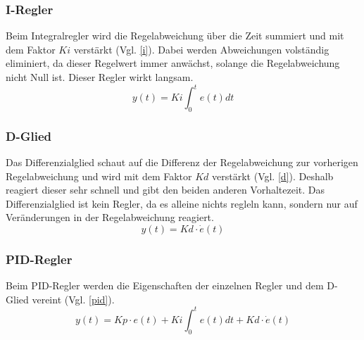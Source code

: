 \documentclass[12pt,a4paper, ngerman]{article}
\begin{document}
\subsubsection{I-Regler}
Beim Integralregler wird die Regelabweichung über die Zeit summiert und mit dem Faktor $Ki$ verstärkt (Vgl. \ref{i}). Dabei werden Abweichungen volständig eliminiert, da dieser Regelwert immer anwächst, solange die Regelabweichung nicht Null ist. Dieser Regler wirkt langsam\cite{website:rn-wissen_Regelungstechnik}.\\
\begin{equation}\label{i}
y(t)=Ki\int_{0}^{t}e(t)dt
\end{equation}

\subsubsection{D-Glied}
Das Differenzialglied schaut auf die Differenz der Regelabweichung zur vorherigen Regelabweichung und wird mit dem Faktor $Kd$ verstärkt (Vgl. \ref{d}). Deshalb reagiert dieser sehr schnell und gibt den beiden anderen Vorhaltezeit. Das Differenzialglied ist kein Regler, da es alleine nichts regleln kann, sondern nur auf Veränderungen in der Regelabweichung reagiert\cite{website:rn-wissen_Regelungstechnik}.\\
\begin{equation}\label{d}
y(t)=Kd\cdot \dot{e}(t)
\end{equation}

\subsubsection{PID-Regler}
Beim PID-Regler werden die Eigenschaften der einzelnen Regler und dem D-Glied vereint (Vgl. \ref{pid})\cite{website:rn-wissen_Regelungstechnik}.
\begin{equation}\label{pid}
y(t)=Kp\cdot e(t)+Ki\int_{0}^{t}e(t)dt+Kd\cdot \dot{e}(t)
\end{equation}
\newpage
\end{document}
